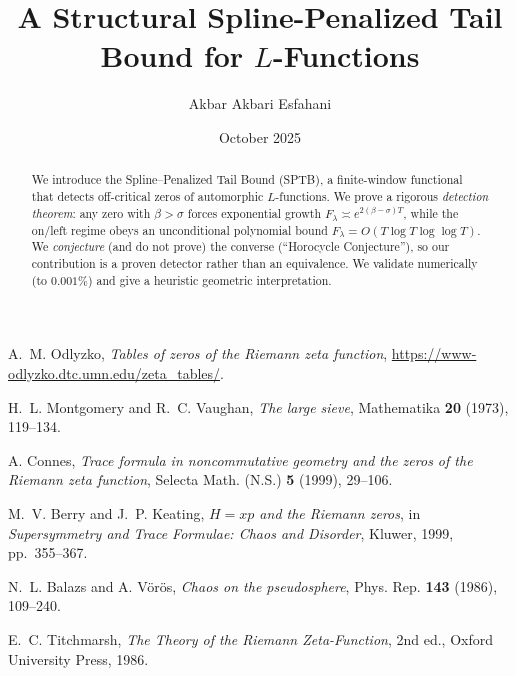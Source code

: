 \documentclass[12pt]{amsart}
\title[A Structural Spline-Penalized Tail Bound]
{A Structural Spline-Penalized Tail Bound for $L$-Functions}
\author{Akbar Akbari Esfahani}
\date{October 2025}
\numberwithin{equation}{section}
\theoremstyle{definition}
\newcommand{\contentbreak}{\clearpage}
\begin{document}
\begin{abstract}
We introduce the Spline–Penalized Tail Bound (SPTB), a finite-window functional that
detects off-critical zeros of automorphic $L$-functions. We prove a rigorous
\emph{detection theorem}: any zero with $\beta>\sigma$ forces exponential growth
$F_\lambda \asymp e^{2(\beta-\sigma)T}$, while the on/left regime obeys an unconditional
polynomial bound $F_\lambda = O(T\log T\log\log T)$. We \emph{conjecture} (and do not prove)
the converse (“Horocycle Conjecture”), so our contribution is a proven detector rather than an equivalence.
We validate numerically (to $0.001\%$) and give a heuristic geometric interpretation.
\end{abstract}

\maketitle
\contentbreak

\tableofcontents
\contentbreak








\contentbreak

\appendix





\contentbreak

\begin{thebibliography}{99}

 A.~M. Odlyzko, 
\textit{Tables of zeros of the Riemann zeta function},
\url{https://www-odlyzko.dtc.umn.edu/zeta_tables/}.

 H.~L. Montgomery and R.~C. Vaughan,
\textit{The large sieve},
Mathematika \textbf{20} (1973), 119--134.

 A. Connes,
\textit{Trace formula in noncommutative geometry and the zeros of the Riemann zeta function},
Selecta Math. (N.S.) \textbf{5} (1999), 29--106.

 M.~V. Berry and J.~P. Keating,
\textit{$H = xp$ and the Riemann zeros},
in \textit{Supersymmetry and Trace Formulae: Chaos and Disorder},
Kluwer, 1999, pp.\ 355--367.

 N.~L. Balazs and A. V\"or\"os,
\textit{Chaos on the pseudosphere},
Phys. Rep. \textbf{143} (1986), 109--240.

 E.~C. Titchmarsh,
\textit{The Theory of the Riemann Zeta-Function},
2nd ed., Oxford University Press, 1986.

\end{thebibliography}
\end{document}
